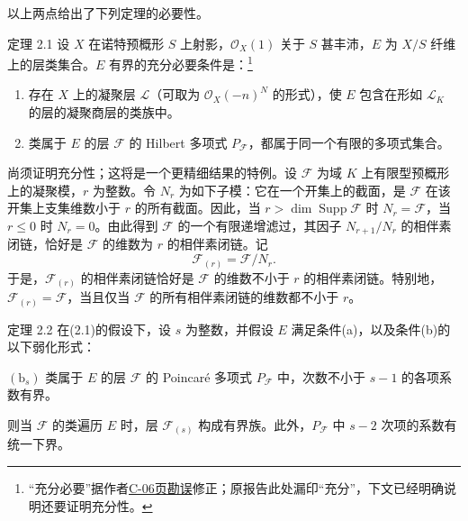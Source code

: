 以上两点给出了下列定理的必要性。
\begin{statement}{定理 2.1}
设 $X$ 在诺特预概形 $S$ 上射影，$\mathcal O_X(1)$ 关于 $S$ 甚丰沛，$E$ 为 $X/S$ 纤维上的层类集合。$E$ 有界的充分必要条件是：\footnote{“充分必要”据作者\hyperref[orig:8]{C-06页勘误}修正；原报告此处漏印“充分”，下文已经明确说明还要证明充分性。}
\begin{enumerate}[label=(\alph*)]
\item 存在 $X$ 上的凝聚层 $\mathcal L$（可取为 $\mathcal O_X(-n)^N$ 的形式），使 $E$ 包含在形如 $\mathcal L_K$ 的层的凝聚商层的类族中。
\item 类属于 $E$ 的层 $\mathcal F$ 的 Hilbert 多项式 $P_{\mathcal F}$，都属于同一个有限的多项式集合。
\end{enumerate}
\end{statement}
尚须证明充分性；这将是一个更精细结果的特例。设 $\mathcal F$ 为域 $K$ 上有限型预概形上的凝聚模，$r$ 为整数。令 $N_r$ 为如下子模：它在一个开集上的截面，是 $\mathcal F$ 在该开集上支集维数小于 $r$ 的所有截面。因此，当 $r>\dim\operatorname{Supp}\mathcal F$ 时 $N_r=\mathcal F$，当 $r\leq0$ 时 $N_r=0$。由此得到 $\mathcal F$ 的一个有限递增滤过，其因子 $N_{r+1}/N_r$ 的相伴素闭链，恰好是 $\mathcal F$ 的维数为 $r$ 的相伴素闭链。记
\[
\mathcal F_{(r)}=\mathcal F/N_r.
\]
于是，$\mathcal F_{(r)}$ 的相伴素闭链恰好是 $\mathcal F$ 的维数不小于 $r$ 的相伴素闭链。特别地，$\mathcal F_{(r)}=\mathcal F$，当且仅当 $\mathcal F$ 的所有相伴素闭链的维数都不小于 $r$。

\begin{statement}{定理 2.2}
在(2.1)的假设下，设 $s$ 为整数，并假设 $E$ 满足条件(a)，以及条件(b)的以下弱化形式：

\noindent $(\mathrm b_s)$ 类属于 $E$ 的层 $\mathcal F$ 的 Poincaré 多项式 $P_{\mathcal F}$ 中，次数不小于 $s-1$ 的各项系数有界。

则当 $\mathcal F$ 的类遍历 $E$ 时，层 $\mathcal F_{(s)}$ 构成有界族。此外，$P_{\mathcal F}$ 中 $s-2$ 次项的系数有统一下界。
\end{statement}

